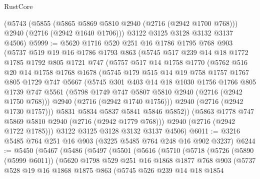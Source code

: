 \begin{lexlean}{RustCore}
\begin{coremodule}
    (@5743
      (@5855 (@5865 @5869 @5810 @2940 (@2716 (@2942 @1700 @768))) @2940 (@2716 (@2942 @1640 @1706)))
      @3122
      @3125
      @3128
      @3132
      @3137
      @4506)
@5999 := @5620
    @1716
    @520
    @251
    @16
    @1786
    @1795
    @768
    @903
    (@5737
      @519
      @19
      @16
      @1786
      @1793
      @863
      (@5745
        @517
        @239
        @14
        @18
        @1772
        @1785
        @1792
        @805
        @1721
        @747
        (@5757
          @517
          @14
          @1758
          @1770
          (@5762
            @516
            @20
            @14
            @1758
            @1768
            @1678
            (@5745
              @179
              @515
              @14
              @19
              @758
              @1757
              @1767
              @805
              @1729
              @747
              @5667
              (@5745
                @301
                @403
                @14
                @18
                @1030
                @1756
                @1766
                @805
                @1739
                @747
                @5561
                (@5798 @1749 @747 @5807 @5810 @2940 (@2716 (@2942 @1750 @768)))
                @2940
                (@2716 (@2942 @1740 @1756)))
              @2940
              (@2716 (@2942 @1730 @1757)))
            @5831
            @5834
            @5837
            @5841
            @5846
            @5852))
        (@5863 @1778 @747 @5869 @5810 @2940 (@2716 (@2942 @1779 @768)))
        @2940
        (@2716 (@2942 @1722 @1785)))
      @3122
      @3125
      @3128
      @3132
      @3137
      @4506)
@6011 := @3216 @5485 @764 @251 @16 @903 (@3225 @5485 @764 @248 @16 @902 @3237)
@6244 := @5450
    (@5467
      (@5486
        (@5497
          (@5501
            (@5616
              (@5710
                (@5718
                  (@5726
                    (@5890 (@5999 @6011))
                    (@5620
                      @1798
                      @529
                      @251
                      @16
                      @1868
                      @1877
                      @768
                      @903
                      (@5737
                        @528
                        @19
                        @16
                        @1868
                        @1875
                        @863
                        (@5745
                          @526
                          @239
                          @14
                          @18
                          @1854

\end{coremodule}
\end{lexlean}
